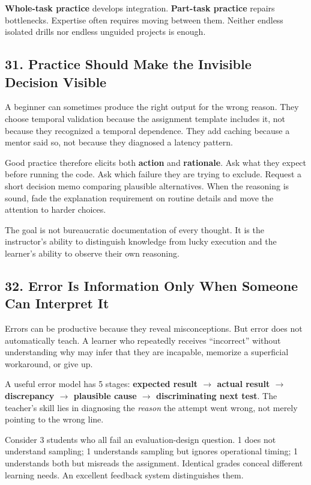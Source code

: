 \textbf{Whole-task practice} develops integration. \textbf{Part-task practice} repairs bottlenecks. Expertise often requires moving between them. Neither endless isolated drills nor endless unguided projects is enough.

\subsection*{31. Practice Should Make the Invisible Decision Visible}

A beginner can sometimes produce the right output for the wrong reason. They choose temporal validation because the assignment template includes it, not because they recognized a temporal dependence. They add caching because a mentor said so, not because they diagnosed a latency pattern.

Good practice therefore elicits both \textbf{action} and \textbf{rationale}. Ask what they expect before running the code. Ask which failure they are trying to exclude. Request a short decision memo comparing plausible alternatives. When the reasoning is sound, fade the explanation requirement on routine details and move the attention to harder choices.

The goal is not bureaucratic documentation of every thought. It is the instructor's ability to distinguish knowledge from lucky execution and the learner's ability to observe their own reasoning.

\subsection*{32. Error Is Information Only When Someone Can Interpret It}

Errors can be productive because they reveal misconceptions. But error does not automatically teach. A learner who repeatedly receives ``incorrect'' without understanding why may infer that they are incapable, memorize a superficial workaround, or give up.

A useful error model has 5 stages: \textbf{expected result $\to$ actual result $\to$ discrepancy $\to$ plausible cause $\to$ discriminating next test}. The teacher's skill lies in diagnosing the \emph{reason} the attempt went wrong, not merely pointing to the wrong line.

Consider 3 students who all fail an evaluation-design question. 1 does not understand sampling; 1 understands sampling but ignores operational timing; 1 understands both but misreads the assignment. Identical grades conceal different learning needs. An excellent feedback system distinguishes them.

